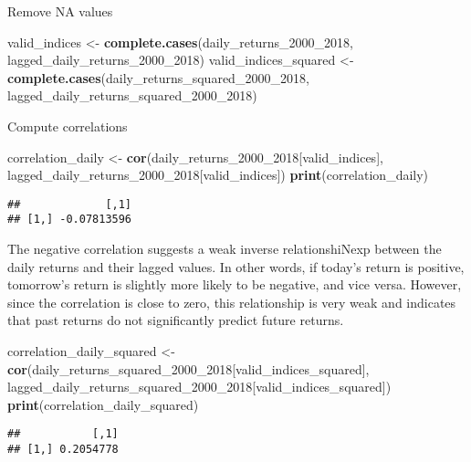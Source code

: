 \documentclass[
]{article}
\newenvironment{Shaded}{\begin{snugshade}}{\end{snugshade}}
\newcommand{\FunctionTok}[1]{\textcolor[rgb]{0.13,0.29,0.53}{\textbf{#1}}}
\newcommand{\NormalTok}[1]{#1}
\newcommand{\OtherTok}[1]{\textcolor[rgb]{0.56,0.35,0.01}{#1}}
\begin{document}
Remove NA values

\begin{Shaded}
\begin{Highlighting}[]
\NormalTok{valid\_indices }\OtherTok{\textless{}{-}} \FunctionTok{complete.cases}\NormalTok{(daily\_returns\_2000\_2018, lagged\_daily\_returns\_2000\_2018)}
\NormalTok{valid\_indices\_squared }\OtherTok{\textless{}{-}} \FunctionTok{complete.cases}\NormalTok{(daily\_returns\_squared\_2000\_2018, lagged\_daily\_returns\_squared\_2000\_2018)}
\end{Highlighting}
\end{Shaded}

Compute correlations

\begin{Shaded}
\begin{Highlighting}[]
\NormalTok{correlation\_daily }\OtherTok{\textless{}{-}} \FunctionTok{cor}\NormalTok{(daily\_returns\_2000\_2018[valid\_indices], lagged\_daily\_returns\_2000\_2018[valid\_indices])}
\FunctionTok{print}\NormalTok{(correlation\_daily)}
\end{Highlighting}
\end{Shaded}

\begin{verbatim}
##             [,1]
## [1,] -0.07813596
\end{verbatim}

The negative correlation suggests a weak inverse relationshiNexp between
the daily returns and their lagged values. In other words, if today's
return is positive, tomorrow's return is slightly more likely to be
negative, and vice versa. However, since the correlation is close to
zero, this relationship is very weak and indicates that past returns do
not significantly predict future returns.

\begin{Shaded}
\begin{Highlighting}[]
\NormalTok{correlation\_daily\_squared }\OtherTok{\textless{}{-}} \FunctionTok{cor}\NormalTok{(daily\_returns\_squared\_2000\_2018[valid\_indices\_squared], lagged\_daily\_returns\_squared\_2000\_2018[valid\_indices\_squared])}
\FunctionTok{print}\NormalTok{(correlation\_daily\_squared)}
\end{Highlighting}
\end{Shaded}

\begin{verbatim}
##           [,1]
## [1,] 0.2054778
\end{verbatim}
\end{document}
